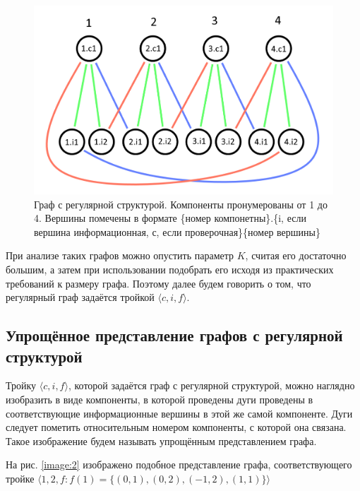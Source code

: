 \documentclass[14pt]{mmcs-article}
\begin{document}
\begin{figure}[H]
  \centering
  \includegraphics[scale=0.4]{Fig_1.png}
  \caption{ Граф с регулярной структурой. Компоненты пронумерованы от 1 до 4. Вершины помечены в формате \{номер компонетны\}.\{i, если вершина информационная, с, если проверочная\}\{номер вершины\} }\label{image:1}
\end{figure}

При анализе таких графов можно опустить параметр $K$, считая его достаточно большим, а затем при использовании подобрать его исходя из практических требований к размеру графа. Поэтому далее будем говорить о том, что регулярный граф задаётся тройкой $\langle c, i, f \rangle$.

\subsection{Упрощённое представление графов с регулярной структурой}

Тройку $\langle c, i, f \rangle$, которой задаётся граф с регулярной структурой, можно наглядно изобразить в виде компоненты, в которой проведены дуги проведены в соответствующие информационные вершины в этой же самой компоненте. Дуги следует пометить относительным номером компоненты, с которой она связана. Такое изображение будем называть упрощённым представлением графа.

На рис. \ref{image:2} изображено подобное представление графа, соответствующего тройке $\langle 1, 2, f: f(1) = \{ (0, 1), (0, 2), (-1, 2), (1, 1) \} \rangle$
\end{document}
